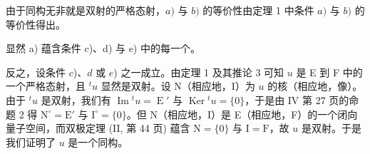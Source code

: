 由于同构无非就是双射的严格态射，\(a)\) 与 \(b)\) 的等价性由定理 1 中条件 \(a)\) 与 \(b)\) 的等价性得出。

显然 a) 蕴含条件 c)、d) 与 e) 中的每一个。

反之，设条件 \(c\))、\(d\) 或 \(e\)) 之一成立。由定理 1 及其推论 3 可知 \(u\) 是 E 到 F 中的一个严格态射，且 \({}^t u\) 显然是双射。设 N（相应地，I）为 \(u\) 的核（相应地，像）。由于 \({}^t u\) 是双射，我们有 \(\operatorname{Im} {}^t u = \operatorname{E}'\) 与 \(\operatorname{Ker} {}^t u = \{0\}\)，于是由 IV 第 27 页的命题 2 得 \(\mathrm{N}^\circ = \mathrm{E}'\) 与 \(\mathrm{I}^\circ = \{0\}\)。但 N（相应地，I）是 E（相应地，F）的一个闭向量子空间，而双极定理 (II, 第 44 页) 蕴含 \(\mathrm{N} = \{0\}\) 与 \(\mathrm{I} = \mathrm{F}\)，故 \(u\) 是双射。于是我们证明了 \(u\) 是一个同构。

